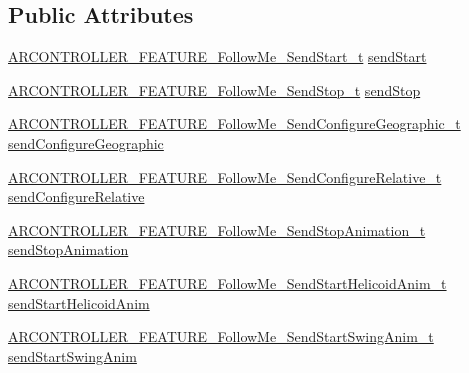 \subsection*{Public Attributes}
\begin{DoxyCompactItemize}
\item 
\hyperlink{_a_r_c_o_n_t_r_o_l_l_e_r___feature_8h_a3ca07dc831e8bc7aefc09e7577e67bcb}{A\+R\+C\+O\+N\+T\+R\+O\+L\+L\+E\+R\+\_\+\+F\+E\+A\+T\+U\+R\+E\+\_\+\+Follow\+Me\+\_\+\+Send\+Start\+\_\+t} \hyperlink{struct_a_r_c_o_n_t_r_o_l_l_e_r___f_e_a_t_u_r_e___follow_me__t_a414b8dcfc5468034cfbfcf8b439affb9}{send\+Start}
\item 
\hyperlink{_a_r_c_o_n_t_r_o_l_l_e_r___feature_8h_a665f5a3c3b92b2a7a5933610592b0239}{A\+R\+C\+O\+N\+T\+R\+O\+L\+L\+E\+R\+\_\+\+F\+E\+A\+T\+U\+R\+E\+\_\+\+Follow\+Me\+\_\+\+Send\+Stop\+\_\+t} \hyperlink{struct_a_r_c_o_n_t_r_o_l_l_e_r___f_e_a_t_u_r_e___follow_me__t_afaf64d660022739017b57741efd2ee27}{send\+Stop}
\item 
\hyperlink{_a_r_c_o_n_t_r_o_l_l_e_r___feature_8h_a4e143b0b075cc03201438ac0ab338b83}{A\+R\+C\+O\+N\+T\+R\+O\+L\+L\+E\+R\+\_\+\+F\+E\+A\+T\+U\+R\+E\+\_\+\+Follow\+Me\+\_\+\+Send\+Configure\+Geographic\+\_\+t} \hyperlink{struct_a_r_c_o_n_t_r_o_l_l_e_r___f_e_a_t_u_r_e___follow_me__t_ac62cbe465f8006ef34d8cfcc09206cb0}{send\+Configure\+Geographic}
\item 
\hyperlink{_a_r_c_o_n_t_r_o_l_l_e_r___feature_8h_a691324ed8e92526d6e78fd5a1534812d}{A\+R\+C\+O\+N\+T\+R\+O\+L\+L\+E\+R\+\_\+\+F\+E\+A\+T\+U\+R\+E\+\_\+\+Follow\+Me\+\_\+\+Send\+Configure\+Relative\+\_\+t} \hyperlink{struct_a_r_c_o_n_t_r_o_l_l_e_r___f_e_a_t_u_r_e___follow_me__t_adc002798bb59098f318b444569b55815}{send\+Configure\+Relative}
\item 
\hyperlink{_a_r_c_o_n_t_r_o_l_l_e_r___feature_8h_ae0eedf38ab49fd1189b025e5046e51ce}{A\+R\+C\+O\+N\+T\+R\+O\+L\+L\+E\+R\+\_\+\+F\+E\+A\+T\+U\+R\+E\+\_\+\+Follow\+Me\+\_\+\+Send\+Stop\+Animation\+\_\+t} \hyperlink{struct_a_r_c_o_n_t_r_o_l_l_e_r___f_e_a_t_u_r_e___follow_me__t_aaa07ad9fd6a68974b08f6917ee5e4404}{send\+Stop\+Animation}
\item 
\hyperlink{_a_r_c_o_n_t_r_o_l_l_e_r___feature_8h_ac2d30dbe058ddc8658c65c0eb8829d92}{A\+R\+C\+O\+N\+T\+R\+O\+L\+L\+E\+R\+\_\+\+F\+E\+A\+T\+U\+R\+E\+\_\+\+Follow\+Me\+\_\+\+Send\+Start\+Helicoid\+Anim\+\_\+t} \hyperlink{struct_a_r_c_o_n_t_r_o_l_l_e_r___f_e_a_t_u_r_e___follow_me__t_ae0191a1f196a9e70e490cc74c1c23292}{send\+Start\+Helicoid\+Anim}
\item 
\hyperlink{_a_r_c_o_n_t_r_o_l_l_e_r___feature_8h_afaaada4d45625b88cc7b30a98702805f}{A\+R\+C\+O\+N\+T\+R\+O\+L\+L\+E\+R\+\_\+\+F\+E\+A\+T\+U\+R\+E\+\_\+\+Follow\+Me\+\_\+\+Send\+Start\+Swing\+Anim\+\_\+t} \hyperlink{struct_a_r_c_o_n_t_r_o_l_l_e_r___f_e_a_t_u_r_e___follow_me__t_a4aa5088c69144a825e55be48689723dc}{send\+Start\+Swing\+Anim}

\end{DoxyCompactItemize}

